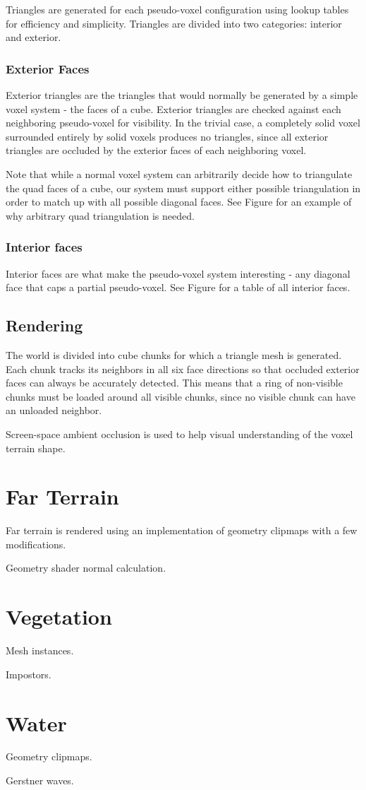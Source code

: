 Triangles are generated for each pseudo-voxel configuration using lookup tables for efficiency and simplicity.
Triangles are divided into two categories: interior and exterior.

\subsubsection{Exterior Faces}

Exterior triangles are the triangles that would normally be generated by a simple voxel system - the faces of a cube.
Exterior triangles are checked against each neighboring pseudo-voxel for visibility.
In the trivial case, a completely solid voxel surrounded entirely by solid voxels produces no triangles, since all exterior triangles are occluded by the exterior faces of each neighboring voxel.

Note that while a normal voxel system can arbitrarily decide how to triangulate the quad faces of a cube, our system must support either possible triangulation in order to match up with all possible diagonal faces.
See Figure  for an example of why arbitrary quad triangulation is needed.

\subsubsection{Interior faces}

Interior faces are what make the pseudo-voxel system interesting - any diagonal face that caps a partial pseudo-voxel.
See Figure  for a table of all interior faces.

\subsection{Rendering}

The world is divided into cube chunks for which a triangle mesh is generated.
Each chunk tracks its neighbors in all six face directions so that occluded exterior faces can always be accurately detected.
This means that a ring of non-visible chunks must be loaded around all visible chunks, since no visible chunk can have an unloaded neighbor.

Screen-space ambient occlusion is used to help visual understanding of the voxel terrain shape.


\section{Far Terrain}

Far terrain is rendered using an implementation of geometry clipmaps with a few modifications.

Geometry shader normal calculation.


\section{Vegetation}

Mesh instances.

Impostors.


\section{Water}

Geometry clipmaps.

Gerstner waves.
